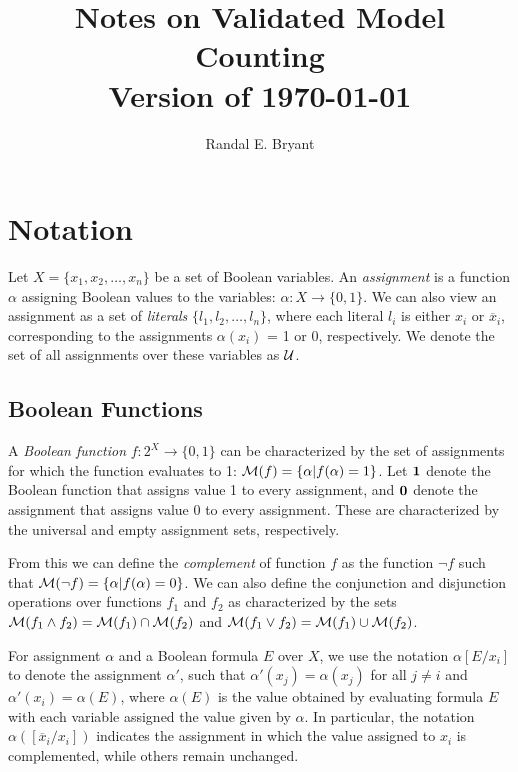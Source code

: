 \documentclass{llncs}
\title{Notes on Validated Model Counting \\ Version of \today}
\author{Randal E. Bryant}
\institute{
Computer Science Department \\
Carnegie Mellon University, Pittsburgh, PA, United States
}
\newcommand{\one}{\mbox{\bf 1}}
\newcommand{\zero}{\mbox{\bf 0}}
\newcommand{\booland}{\land}
\newcommand{\boolor}{\lor}
\newcommand{\boolnot}{\neg}
\newcommand{\tautology}{1}
\newcommand{\nil}{0}
\newcommand{\obar}[1]{\overline{#1}}
\newcommand{\interp}{\alpha}
\newcommand{\uinterp}{{\cal U}}
\newcommand{\interpset}[1]{{\cal M}(#1)}
\newcommand{\subs}[2]{[#2/#1]}
\begin{document}
\maketitle

\section{Notation}

Let $X = \{x_1, x_2, \ldots, x_n\}$ be a set of Boolean variables.  An
{\em assignment} is a function $\interp$ assigning Boolean values to
the variables: $\interp:X \rightarrow \{\nil, \tautology\}$.  We can
also view an assignment as a set of {\em literals} $\{l_1, l_2,
\ldots, l_n\}$, where each literal $l_i$ is either $x_i$ or
$\obar{x}_i$, corresponding to the assignments $\interp(x_i)$ = 1 or 0,
respectively.  We denote the set of all assignments over these variables as $\uinterp$.

\subsection{Boolean Functions}

A {\em Boolean function} $f:2^X \rightarrow \{0,1\}$ can be
characterized by the set of assignments for which the function
evaluates to 1: $\interpset{f} = \{ \interp | f(\interp) = 1\}$.  Let
$\one$ denote the Boolean function that assigns value 1 to every
assignment, and $\zero$ denote the assignment that assigns value 0 to
every assignment.  These are characterized by the universal and empty
assignment sets, respectively.


From
this we can define the {\em complement} of function $f$ as the function
$\boolnot f$ such that
$\interpset{\boolnot f} = \{ \interp | f(\interp) = 0\}$.
We can also define the conjunction and disjunction operations over functions $f_1$ and $f_2$ as characterized by the sets
$\interpset{f_1 \booland f_2} = \interpset{f_1} \cap \interpset{f_2}$ and
$\interpset{f_1 \boolor f_2} = \interpset{f_1} \cup \interpset{f_2}$.

For assignment $\interp$ and a Boolean formula $E$ over $X$, we
use the notation $\interp\subs{x_i}{E}$ to denote the assignment
$\interp'$, such that $\interp'(x_j) = \interp(x_j)$ for all $j \not = i$
and $\interp'(x_i) = \interp(E)$, where $\interp(E)$ is the value obtained by evaluating formula $E$ with each variable assigned the value given by $\interp$.
In particular, the notation
$\interp(\subs{x_i}{\obar{x}_i})$
indicates the assignment in which the value
assigned to $x_i$ is complemented, while others remain unchanged.
\end{document}
